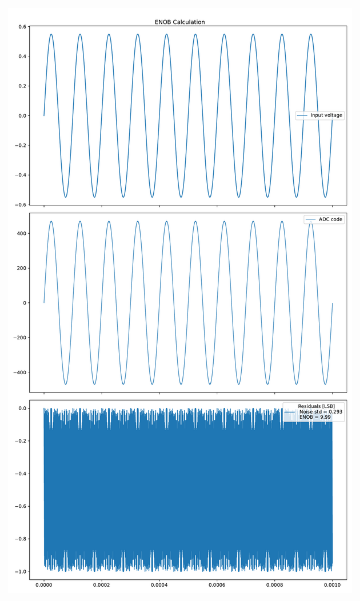 \documentclass[varwidth]{standalone}
\begin{document}
\begin{figure}
\begin{subfigure}{0.32\textwidth}
    \includegraphics[width=\textwidth]{behavioral_10b_ideal_enob.pdf}
\end{subfigure}
\begin{subfigure}{0.32\textwidth}
    \begin{table}
    \let\center\empty
    \let\endcenter\relax
    \centering
    \resizebox{0.3\width}{!}{}
    \end{table}

\end{subfigure}
\end{figure}
\end{document}
